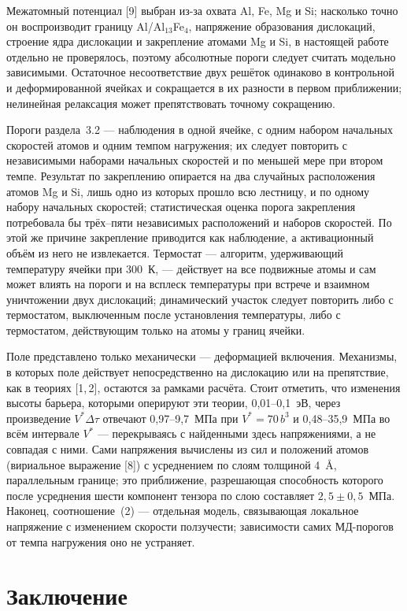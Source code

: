 Межатомный потенциал [9] выбран из-за охвата Al, Fe, Mg и Si; насколько точно
он воспроизводит границу Al/Al$_{13}$Fe$_4$, напряжение образования
дислокаций, строение ядра дислокации и закрепление атомами Mg и Si, в
настоящей работе отдельно не проверялось, поэтому абсолютные пороги следует
считать модельно зависимыми. Остаточное несоответствие двух решёток одинаково
в контрольной и деформированной ячейках и сокращается в их разности в первом
приближении; нелинейная релаксация может препятствовать точному сокращению.

Пороги раздела~3.2 --- наблюдения в одной ячейке, с одним набором начальных
скоростей атомов и одним темпом нагружения; их следует повторить с
независимыми наборами начальных скоростей и по меньшей мере при втором темпе.
Результат по закреплению опирается на два случайных расположения атомов Mg
и Si, лишь одно из которых прошло всю лестницу, и по одному набору начальных
скоростей; статистическая оценка порога закрепления
потребовала бы трёх--пяти независимых расположений и наборов скоростей. По
этой же причине закрепление приводится как наблюдение, а активационный объём
из него не извлекается. Термостат --- алгоритм, удерживающий температуру
ячейки при 300~К, --- действует на все подвижные атомы и сам может влиять на
пороги и на всплеск температуры при встрече и взаимном уничтожении двух
дислокаций; динамический участок следует
повторить либо с термостатом, выключенным после установления температуры,
либо с термостатом, действующим только на атомы у границ ячейки.

Поле представлено только механически --- деформацией включения. Механизмы, в
которых поле действует непосредственно на дислокацию или на препятствие, как
в теориях [1,\,2], остаются за рамками расчёта. Стоит отметить, что изменения
высоты барьера, которыми оперируют эти теории, 0{,}01--0{,}1~эВ, через
произведение $V^{*}\Delta\tau$ отвечают 0{,}97--9{,}7~МПа при
$V^{*} = 70\,b^{3}$ и 0{,}48--35{,}9~МПа во всём интервале $V^{*}$ ---
перекрываясь с найденными здесь напряжениями, а не совпадая с ними. Сами
напряжения вычислены из сил и положений атомов (вириальное выражение [8]) с
усреднением по слоям толщиной 4~\AA{}, параллельным границе; это приближение,
разрешающая способность которого после усреднения шести компонент тензора
по слою составляет $2{,}5 \pm 0{,}5$~МПа. Наконец, соотношение~(2) --- отдельная
модель, связывающая локальное напряжение с изменением скорости ползучести;
зависимости самих МД-порогов от темпа нагружения оно не устраняет.

\section{Заключение}


